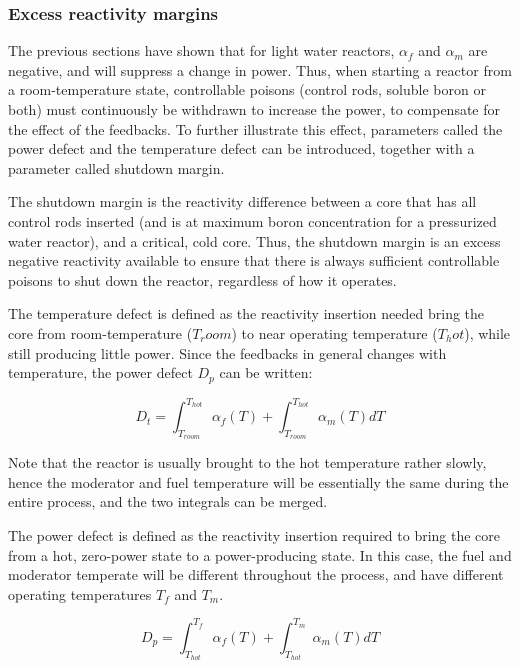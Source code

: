 \subsubsection{Excess reactivity margins}
The previous sections have shown that for light water reactors, $\alpha_f$ and $\alpha_m$ are negative, and will suppress a change in power. Thus, when starting a reactor from a room-temperature state, controllable poisons (control rods, soluble boron or both) must continuously be withdrawn to increase the power, to compensate for the effect of the feedbacks. To further illustrate this effect, parameters called the power defect and the temperature defect can be introduced, together with a parameter called shutdown margin.

The shutdown margin is the reactivity difference between a core that has all control rods inserted (and is at maximum boron concentration for a pressurized water reactor), and a critical, cold core. Thus, the shutdown margin is an excess negative reactivity available to ensure that there is always sufficient controllable poisons to shut down the reactor, regardless of how it operates. 

The temperature defect is defined as the reactivity insertion needed bring the core from room-temperature ($T_room$) to near operating temperature ($T_hot$), while still producing little power. Since the feedbacks in general changes with temperature, the power defect $D_p$ can be written:

\begin{equation} \label{eq:D_t}
D_t = \int_{T_{room}}^{T_{hot}}\alpha_f(T) + \int_{T_{room}}^{T_{hot}}\alpha_m(T)dT
\end{equation}

Note that the reactor is usually brought to the hot temperature rather slowly, hence the moderator and fuel temperature will be essentially the same during the entire process, and the two integrals can be merged.

The power defect is defined as the reactivity insertion required to bring the core from a hot, zero-power state to a power-producing state. In this case, the fuel and moderator temperate will be different throughout the process, and have different operating temperatures $T_f$ and $T_m$.

\begin{equation} \label{eq:D_p}
D_p = \int_{T_{hot}}^{T_f}\alpha_f(T) + \int_{T_{hot}}^{T_m}\alpha_m(T)dT
\end{equation}

